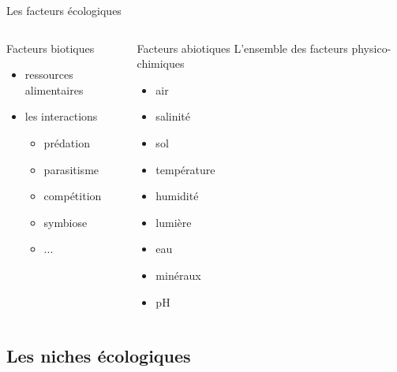 \documentclass[10pt]{beamer}
\begin{document}
\begin{frame}{Les facteurs écologiques}
  \begin{columns}
    \begin{column}[c]{0.5\textwidth}
     \begin{block}{Facteurs biotiques}
       \begin{itemize}
        \item ressources alimentaires
        \item les interactions
          \begin{itemize}
          \item prédation
          \item parasitisme
          \item compétition
          \item symbiose
          \item ...
          \end{itemize}
        \end{itemize}
    \end{block}
   \end{column}
    \begin{column}[c]{0.5\textwidth}
      \begin{block}{Facteurs abiotiques}
        L'ensemble des facteurs physico-chimiques
        \begin{itemize}
        \item air
        \item salinité
        \item sol
        \item température
        \item humidité
        \item lumière
        \item eau
        \item minéraux
        \item pH
        \end{itemize}
    \end{block}
    \end{column}
  \end{columns}
\end{frame}



\subsection{Les niches écologiques}
\end{document}
